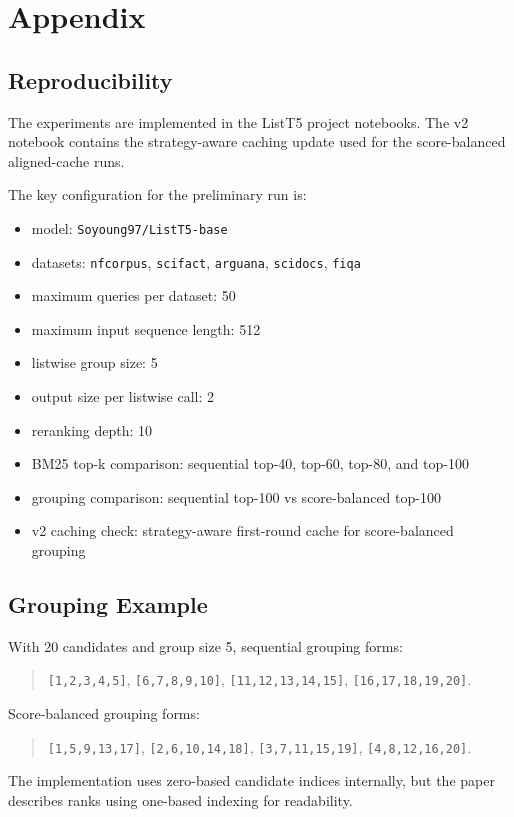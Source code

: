 \section{Appendix}
\label{sec:appendix}

\subsection{Reproducibility}

The experiments are implemented in the ListT5 project notebooks.
The v2 notebook contains the strategy-aware caching update used for the score-balanced aligned-cache runs.

The key configuration for the preliminary run is:
\begin{itemize}
  \item model: \texttt{Soyoung97/ListT5-base}
  \item datasets: \texttt{nfcorpus}, \texttt{scifact}, \texttt{arguana}, \texttt{scidocs}, \texttt{fiqa}
  \item maximum queries per dataset: 50
  \item maximum input sequence length: 512
  \item listwise group size: 5
  \item output size per listwise call: 2
  \item reranking depth: 10
  \item BM25 top-k comparison: sequential top-40, top-60, top-80, and top-100
  \item grouping comparison: sequential top-100 vs score-balanced top-100
  \item v2 caching check: strategy-aware first-round cache for score-balanced grouping
\end{itemize}

\subsection{Grouping Example}

With 20 candidates and group size 5, sequential grouping forms:
\begin{quote}
\texttt{[1,2,3,4,5]}, \texttt{[6,7,8,9,10]}, \texttt{[11,12,13,14,15]}, \texttt{[16,17,18,19,20]}.
\end{quote}

Score-balanced grouping forms:
\begin{quote}
\texttt{[1,5,9,13,17]}, \texttt{[2,6,10,14,18]}, \texttt{[3,7,11,15,19]}, \texttt{[4,8,12,16,20]}.
\end{quote}

The implementation uses zero-based candidate indices internally, but the paper describes ranks using one-based indexing for readability.
